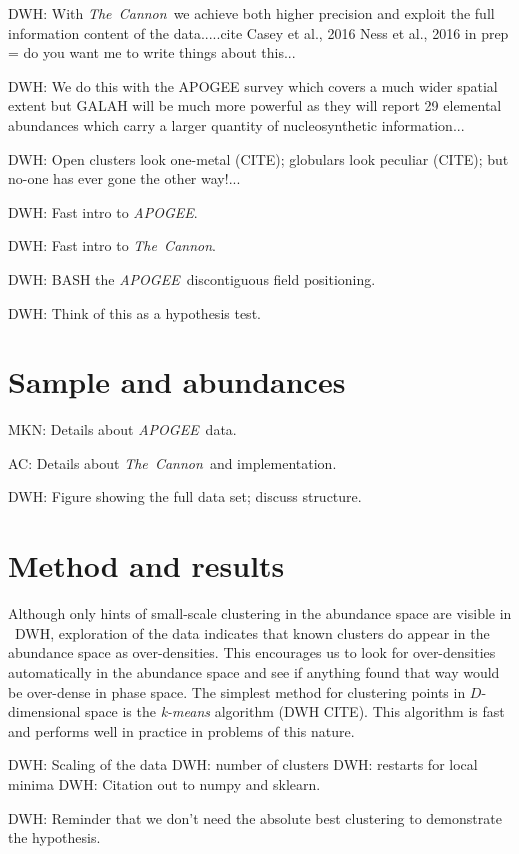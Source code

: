 \documentclass[12pt, letterpaper, preprint]{aastex}
\newcommand{\acronym}[1]{{\small{#1}}}
\newcommand{\project}[1]{\textsl{#1}}
\newcommand{\apogee}{\project{\acronym{APOGEE}}}
\newcommand{\thecannon}{\project{The~Cannon}}
\begin{document}
DWH: With \thecannon\ we achieve both higher precision and exploit the full
information content of the data.....cite Casey et al., 2016 Ness et
al., 2016 in prep = do you want me to write things about this...

DWH: We do this with the APOGEE survey which covers a much wider
spatial extent but GALAH will be much more powerful as they will
report 29 elemental abundances which carry a larger quantity of
nucleosynthetic information...

DWH: Open clusters look one-metal (CITE); globulars look peculiar
(CITE); but no-one has ever gone the other way!...

DWH: Fast intro to \apogee.

DWH: Fast intro to \thecannon.

DWH: BASH the \apogee\ discontiguous field positioning.

DWH: Think of this as a hypothesis test.

\section{Sample and abundances}

MKN: Details about \apogee\ data.

AC: Details about \thecannon\ and implementation.

DWH: Figure showing the full data set; discuss structure.

\section{Method and results}

Although only hints of small-scale clustering in the abundance space
are visible in \figurename~DWH, exploration of the data indicates that
known clusters do appear in the abundance space as over-densities.
This encourages us to look for over-densities automatically in the
abundance space and see if anything found that way would be over-dense
in phase space.
The simplest method for clustering points in $D$-dimensional space is
the \emph{k-means} algorithm (DWH CITE).
This algorithm is fast and performs well in practice in problems of
this nature.

DWH: Scaling of the data
DWH: number of clusters
DWH: restarts for local minima
DWH: Citation out to numpy and sklearn.

DWH: Reminder that we don't need the absolute best clustering to
demonstrate the hypothesis.
\end{document}
